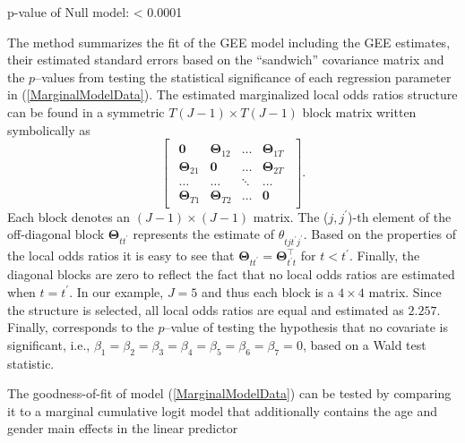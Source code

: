 \documentclass[
]{jss}
\begin{document}
\begin{CodeChunk}
\begin{CodeOutput}
p-value of Null model: < 0.0001 
\end{CodeOutput}
\end{CodeChunk}

The  method summarizes the fit of the GEE model including
the GEE estimates, their estimated standard errors based on the
``sandwich'' covariance matrix and the \(p\)--values from testing the
statistical significance of each regression parameter in
(\ref{MarginalModelData}). The estimated marginalized local odds ratios
structure can be found in a symmetric \(T(J-1) \times T(J-1)\) block
matrix written symbolically as \[\begin{bmatrix}
\begin{array}{cccc}
\mathbf 0                               &\boldsymbol{\Theta}_{12}                 &\ldots  &\boldsymbol{\Theta}_{1T} \\
\boldsymbol{\Theta}_{21}       &\mathbf 0                                &\ldots  &\boldsymbol{\Theta}_{2T} \\
\ldots                                  &\ldots                                   &\ddots  & \ldots          \\
\boldsymbol{\Theta}_{T1}       &\boldsymbol{\Theta}_{T2}        &\ldots  &\mathbf 0
\end{array}
\end{bmatrix}.\] Each block denotes an \((J-1) \times (J-1)\) matrix.
The (\(j,j^{\prime}\))-th element of the off-diagonal block
\(\boldsymbol{\Theta}_{tt^{\prime}}\) represents the estimate of
\(\theta_{tjt^{\prime}j^{\prime}}\). Based on the properties of the
local odds ratios it is easy to see that
\(\boldsymbol{\Theta}_{tt^{\prime}}=\boldsymbol{\Theta}^{\top}_{t^{\prime}t}\)
for \(t<t^{\prime}\). Finally, the diagonal blocks are zero to reflect
the fact that no local odds ratios are estimated when \(t=t^{\prime}\).
In our example, \(J=5\) and thus each block is a \(4 \times 4\) matrix.
Since the  structure is selected, all local odds ratios
are equal and estimated as \(2.257\). Finally,
 corresponds to the \(p\)--value of testing
the hypothesis that no covariate is significant, i.e.,
\(\beta_1=\beta_2=\beta_3=\beta_4 =\beta_5=\beta_6=\beta_7=0\), based on
a Wald test statistic.

The goodness-of-fit of model (\ref{MarginalModelData}) can be tested by
comparing it to a marginal cumulative logit model that additionally
contains the age and gender main effects in the linear predictor
\end{document}
